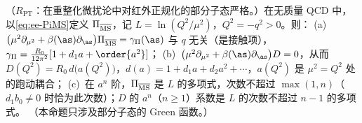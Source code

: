 \begin{proposition}\label{prop:ee-adler-rg}
（$R_{\mathrm{PT}}$：在重整化微扰论中对红外正规化的部分子态严格。）在无质量 QCD 中，以\cref{eq:ee-PiMS}定义 $\Pi_{\overline{\rm MS}}$，记 $L=\ln(Q^2/\mu^2)$，$Q^2=-q^2>0$。则：
(a)~$\big(\mu^2\partial_{\mu^2}+\beta(\as)\partial_{\as}\big)\Pi_{\overline{\rm MS}}=\gamma_\Pi(\as)$ 与 $q$ 无关（是接触项），$\gamma_\Pi=\frac{R_0}{12\pi^2}[1+d_1a+\order{a^2}]$；
(b)~$\big(\mu^2\partial_{\mu^2}+\beta(\as)\partial_{\as}\big)D=0$，从而 $D(Q^2)=R_0\,d\big(a(Q^2)\big)$，$d(a)=1+d_1a+d_2a^2+\cdots$，$a(Q^2)$ 是 $\mu^2=Q^2$ 处的跑动耦合；
(c)~在 $a^n$ 阶，$\Pi_{\overline{\rm MS}}$ 是 $L$ 的多项式，次数不超过 $\max(1,n)$（$d_1b_0\ne0$ 时恰为此次数）；$D$ 的 $a^n$（$n\ge1$）系数是 $L$ 的次数不超过 $n-1$ 的多项式。%
（本命题只涉及部分子态的 Green 函数。）
\end{proposition}
